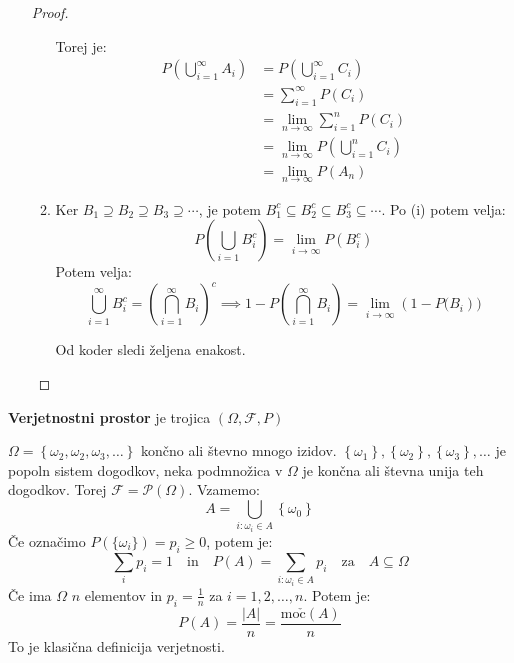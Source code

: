 \documentclass[12pt]{book}
\def\n{\noindent}
\theoremstyle{definition}
\theoremstyle{plain}
\theoremstyle{plain}
\theoremstyle{plain}
\theoremstyle{remark}
\begin{document}
\begin{enumerate}[label=(\alph*)]
\begin{proof}
\begin{enumerate}[label=(\roman*)]
            Torej je: 
            $$
            \begin{aligned} 
                P\left(\bigcup_{i=1}^{\infty} A_i \right) &= P\left(\bigcup_{i=1}^{\infty} C_i\right) \\ 
                &= \sum_{i=1}^{\infty} P(C_i) \\ &= \lim _{n \to \infty} \sum_{i=1}^{n} P(C_i) \\ 
                &= \lim _{n \to \infty} P\left(\bigcup_{i=1}^n C_i\right) \\ 
                &= \lim_{n \to \infty} P(A_n) 
            \end{aligned}
            $$ 
            \item Ker $B_1 \supseteq B_2 \supseteq B_3 \supseteq \cdots$, je potem $B_1^c \subseteq B_2^c \subseteq B_3^c \subseteq \cdots$. Po (i) potem velja:
            $$
            P\left(\bigcup_{i=1} B_i^c\right)=\lim _{i \to \infty} P\left(B_i^c\right)
            $$ 
            Potem velja: 
            $$
            \bigcup_{i=1}^{\infty} B_i^c=\left(\bigcap_{i=1}^{\infty} B_i\right)^c \implies 1-P\left(\bigcap_{i=1}^{\infty} B_i\right)=\lim_{i \to \infty}\left(1-P(B_i\right)) 
            $$
            
            Od koder sledi željena enakost. 
        \end{enumerate}
    \end{proof}
\end{enumerate}

\n \textbf{Verjetnostni prostor} je trojica $(\Omega, \mathcal{F}, P)$

\begin{zgled}
    $\Omega=\left\{\omega_2, \omega_2, \omega_3, \ldots\right\}$ končno ali števno mnogo izidov. $\left\{\omega_1\right\},\left\{\omega_2\right\},\left\{\omega_3\right\}, \ldots$ je popoln sistem dogodkov, neka podmnožica v $\Omega$ je končna ali števna unija teh dogodkov. Torej $\mathcal{F}=\mathcal{P}(\Omega)$. Vzamemo:
    $$
    A=\bigcup_{i: \omega_i \in A}\left\{\omega_0\right\} 
    $$
    Če označimo $P(\{\omega_i\}) = p_i \geq 0$, potem je: 
    $$
    \sum_i p_i=1 \quad \text{in} \quad P(A)=\sum_{i: \omega_i \in A} p_i \quad \text{za} \quad A \subseteq \Omega
    $$
    Če ima $\Omega$ $n$ elementov in $p_i = \frac{1}{n}$ za $i=1, 2, \ldots, n$. Potem je:
    $$
    P(A)=\frac{|A|}{n}=\frac{\operatorname{mo\check{c}}(A)}{n}
    $$
    To je klasična definicija verjetnosti. 
\end{zgled}
\end{document}
